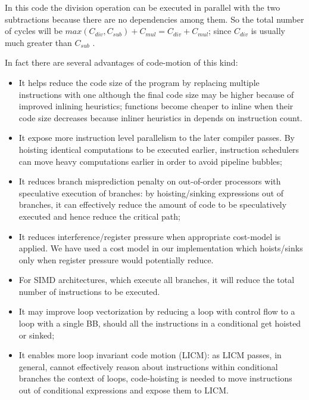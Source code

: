 \documentclass[acmlarge,review]{acmart}\settopmatter{printfolios=true}
\begin{document}
In this code the division operation can be executed in parallel with the two
subtractions because there are no dependencies among them. So the total number
of cycles will be $max(C_{div}, C_{sub}) + C_{mul} = C_{div} + C_{mul}$; since
$C_{div}$ is usually much greater than $C_{sub}$ \cite{x86,aarch64}.


In fact there are several advantages of code-motion of this kind:
\begin{itemize}
\item It helps reduce the code size of the program by replacing multiple
  instructions with one although the final code size may be higher because of
  improved inlining heuristics; functions become cheaper to inline when their
  code size decreases because inliner heuristics in \LLVM{} depends on
  instruction count.
\item It expose more instruction level parallelism to the later compiler
  passes. By hoisting identical computations to be executed earlier, instruction
  schedulers can move heavy computations earlier in order to avoid pipeline
  bubbles;
\item It reduces branch misprediction penalty on out-of-order processors with
  speculative execution of branches: by hoisting/sinking expressions out of
  branches, it can effectively reduce the amount of code to be speculatively
  executed and hence reduce the critical path;
\item It reduces interference/register pressure when appropriate cost-model is
  applied. We have used a cost model in our implementation which hoists/sinks only
  when register pressure would potentially reduce.
\item For SIMD architectures, which execute all branches, it will reduce the
  total number of instructions to be executed.
\item It may improve loop vectorization by reducing a loop with control flow to
  a loop with a single BB, should all the instructions in a conditional get
  hoisted or sinked;
\item It enables more loop invariant code motion (LICM): as LICM passes, in
  general, cannot effectively reason about instructions within conditional
  branches the context of loops, code-hoisting is needed to move instructions
  out of conditional expressions and expose them to LICM.
\end{itemize}
\end{document}
